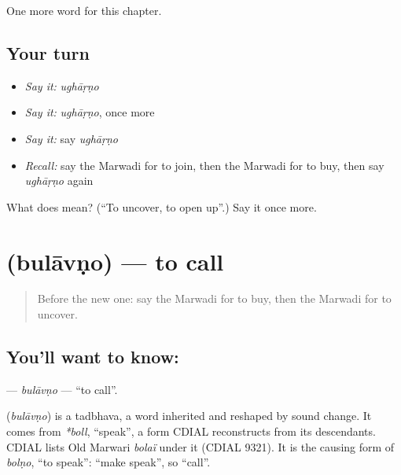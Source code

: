 \begin{grammarlens}[title={What you've built}]
One more word for this chapter.
\end{grammarlens}

\subsection*{Your turn}
\begin{itemize}
\raggedright
  \item \emph{Say it:} \emph{ughāṛṇo}
  \item \emph{Say it:} \emph{ughāṛṇo}, once more
  \item \emph{Say it:} say \emph{ughāṛṇo}
  \item \emph{Recall:} say the Marwadi for to join, then the Marwadi for to buy, then say \emph{ughāṛṇo} again
\end{itemize}

\begin{tcolorbox}[breakable,colback=teal!4,colframe=teal!35!black,title={Before you move on}]
What does  mean? (\textquotedblleft{}To uncover, to open up\textquotedblright{}.) Say it once more.
\end{tcolorbox}
\section[\texorpdfstring{\mw{बुलावणो} (bulāvṇo)}{बुलावणो (bulāvṇo)}]{ (bulāvṇo) — to call}

\label{lesson:MW-C104-bulavno}



\begin{quote}
Before the new one: say the Marwadi for to buy, then the Marwadi for to uncover.
\end{quote}

\subsection*{You'll want to know: }
\textbf{} — \emph{bulāvṇo} — \textquotedblleft{}to call\textquotedblright{}.

\begin{cousinweb}
\textbf{} (\emph{bulāvṇo}) is a tadbhava, a word inherited and reshaped by sound change. It comes from \emph{*boll}, \textquotedblleft{}speak\textquotedblright{}, a form CDIAL reconstructs from its descendants. CDIAL lists Old Marwari \emph{bolaï} under it (CDIAL 9321). It is the causing form of \emph{bolṇo}, \textquotedblleft{}to speak\textquotedblright{}: \textquotedblleft{}make speak\textquotedblright{}, so \textquotedblleft{}call\textquotedblright{}.
\end{cousinweb}

